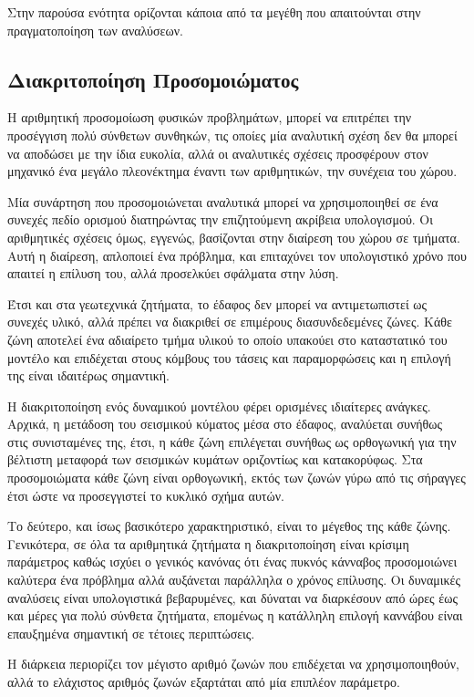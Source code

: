 Στην παρούσα ενότητα ορίζονται κάποια από τα μεγέθη που απαιτούνται στην πραγματοποίηση των αναλύσεων.
\subsection{Διακριτοποίηση Προσομοιώματος}
\label{sbs:mesh}
Η αριθμητική προσομοίωση φυσικών προβλημάτων, μπορεί να επιτρέπει την προσέγγιση πολύ σύνθετων συνθηκών, τις οποίες μία αναλυτική σχέση δεν θα μπορεί να αποδώσει με την ίδια ευκολία, αλλά οι αναλυτικές σχέσεις προσφέρουν στον μηχανικό ένα μεγάλο πλεονέκτημα έναντι των αριθμητικών, την συνέχεια του χώρου.

Μία συνάρτηση που προσομοιώνεται αναλυτικά μπορεί να χρησιμοποιηθεί σε ένα συνεχές πεδίο ορισμού διατηρώντας την επιζητούμενη ακρίβεια υπολογισμού. Οι αριθμητικές σχέσεις όμως, εγγενώς, βασίζονται στην διαίρεση του χώρου σε τμήματα. Αυτή η διαίρεση, απλοποιεί ένα πρόβλημα, και επιταχύνει τον υπολογιστικό χρόνο που απαιτεί η επίλυση του, αλλά προσελκύει σφάλματα στην λύση.

Έτσι και στα γεωτεχνικά ζητήματα, το έδαφος δεν μπορεί να αντιμετωπιστεί ως συνεχές υλικό, αλλά πρέπει να διακριθεί σε επιμέρους διασυνδεδεμένες ζώνες. Κάθε ζώνη αποτελεί ένα αδιαίρετο τμήμα υλικού το οποίο υπακούει στο καταστατικό του μοντέλο και επιδέχεται στους κόμβους του τάσεις και παραμορφώσεις και η επιλογή της είναι ιδαιτέρως σημαντική.

Η διακριτοποίηση ενός δυναμικού μοντέλου φέρει ορισμένες ιδιαίτερες ανάγκες. Αρχικά, η μετάδοση του σεισμικού κύματος μέσα στο έδαφος, αναλύεται συνήθως στις συνισταμένες της, έτσι, η κάθε ζώνη επιλέγεται συνήθως ως ορθογωνική για την βέλτιστη μεταφορά των σεισμικών κυμάτων οριζοντίως και κατακορύφως. Στα προσομοιώματα κάθε ζώνη είναι ορθογωνική, εκτός των ζωνών γύρω από τις σήραγγες έτσι ώστε να προσεγγιστεί το κυκλικό σχήμα αυτών.

Το δεύτερο, και ίσως βασικότερο χαρακτηριστικό, είναι το μέγεθος της κάθε ζώνης. Γενικότερα, σε όλα τα αριθμητικά ζητήματα η διακριτοποίηση είναι κρίσιμη παράμετρος καθώς ισχύει ο γενικός κανόνας ότι ένας πυκνός κάνναβος προσομοιώνει καλύτερα ένα πρόβλημα αλλά αυξάνεται παράλληλα ο χρόνος επίλυσης. Οι δυναμικές αναλύσεις είναι υπολογιστικά βεβαρυμένες, και δύναται να διαρκέσουν από ώρες έως και μέρες για πολύ σύνθετα ζητήματα, επομένως η κατάλληλη επιλογή καννάβου είναι επαυξημένα σημαντική σε τέτοιες περιπτώσεις.

Η διάρκεια περιορίζει τον μέγιστο αριθμό ζωνών που επιδέχεται να χρησιμοποιηθούν, αλλά το ελάχιστος αριθμός ζωνών εξαρτάται από μία επιπλέον παράμετρο.

